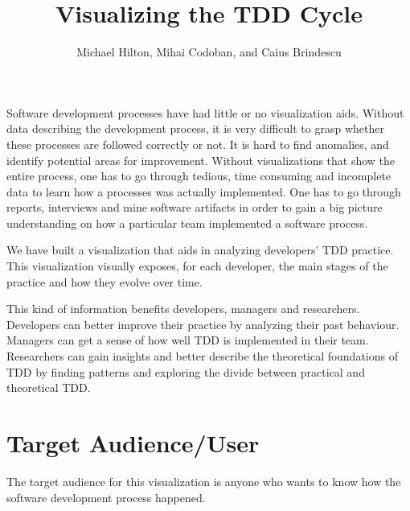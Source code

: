 \documentclass[journal]{vgtc}                %
\title{Visualizing the TDD Cycle}
\author{Michael Hilton, Mihai Codoban, and Caius Brindescu}
\begin{document}


\maketitle


Software development processes have had little or no visualization aids.
Without data describing the development process, it is very difficult to grasp whether these processes are followed correctly or not. It is hard to find anomalies, and identify potential areas for improvement. Without visualizations that show the entire process, one has to go through tedious, time consuming and incomplete data to learn how a processes was actually implemented. One has to go through reports, interviews and mine software artifacts in order to gain a big picture understanding on how a particular team implemented a software process.

We have built a visualization that aids in analyzing developers' TDD practice. This visualization visually exposes, for each developer, the main stages of the practice and how they evolve over time.

This kind of information benefits developers, managers and researchers. Developers can better improve their practice by analyzing their past behaviour. Managers can get a sense of how well TDD is implemented in their team. Researchers can gain insights and better describe the theoretical foundations of TDD by finding patterns and exploring the divide between practical and theoretical TDD.

\section{Target Audience/User}

The target audience for this visualization is anyone who wants to know how the software development process happened.  
\end{document}
